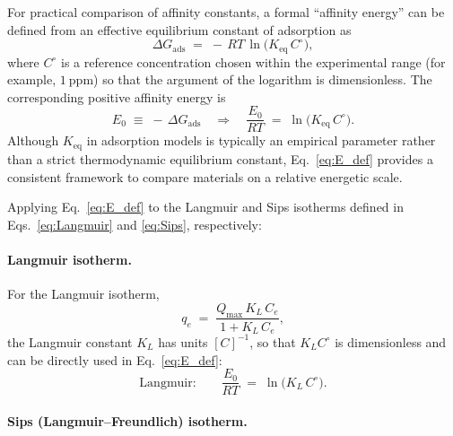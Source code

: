 \documentclass[12pt]{article}
\begin{document}
	For practical comparison of affinity constants, a formal ``affinity energy'' can be defined from an effective equilibrium constant of adsorption as
	\begin{equation}
		\Delta G_{\mathrm{ads}} \;=\; -\,RT\,\ln\!\big(K_{\mathrm{eq}}\,C^\circ\big),
	\end{equation}
	where \(C^\circ\) is a reference concentration chosen within the experimental range (for example, \(1~\mathrm{ppm}\)) so that the argument of the logarithm is dimensionless. The corresponding positive affinity energy is
	\begin{equation}
		E_0 \;\equiv\; -\,\Delta G_{\mathrm{ads}}
		\quad\Rightarrow\quad
		\frac{E_0}{RT} \;=\; \ln\!\big(K_{\mathrm{eq}}\,C^\circ\big).
		\label{eq:E_def}
	\end{equation}
	Although \(K_{\mathrm{eq}}\) in adsorption models is typically an empirical parameter rather than a strict thermodynamic equilibrium constant, Eq.~\eqref{eq:E_def} provides a consistent framework to compare materials on a relative energetic scale.
	
	Applying Eq.~\eqref{eq:E_def} to the Langmuir and Sips isotherms defined in Eqs.~\eqref{eq:Langmuir} and \eqref{eq:Sips}, respectively:
	
	\paragraph{Langmuir isotherm.}
	
	For the Langmuir isotherm,
	\begin{equation}
		q_e \;=\; \frac{Q_{\max}\,K_L\,C_e}{1 + K_L\,C_e},
	\end{equation}
	the Langmuir constant \(K_L\) has units \([C]^{-1}\), so that \(K_L C^\circ\) is dimensionless and can be directly used in Eq.~\eqref{eq:E_def}:
	\begin{equation}
		\text{Langmuir:}\qquad
		\frac{E_0}{RT} \;=\; \ln\!\big(K_L\,C^\circ\big).
		\label{eq:E_langmuir}
	\end{equation}
	
	\paragraph{Sips (Langmuir--Freundlich) isotherm.}
	
\end{document}

